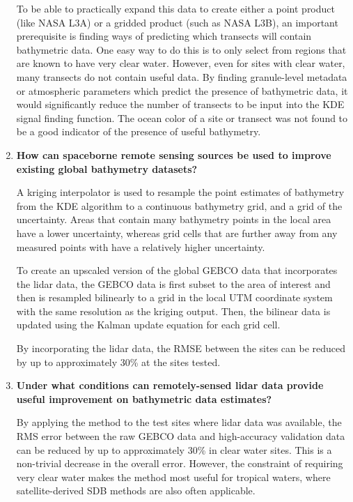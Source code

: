 \begin{enumerate}
    To be able to practically expand this data to create either a point product (like NASA L3A) or a gridded product (such as NASA L3B), an important prerequisite is finding ways of predicting which transects will contain bathymetric data. One easy way to do this is to only select from regions that are known to have very clear water. However, even for sites with clear water, many transects do not contain useful data. By finding granule-level metadata or atmospheric parameters which predict the presence of bathymetric data, it would significantly reduce the number of transects to be input into the KDE signal finding function. The ocean color of a site or transect was not found to be a good indicator of the presence of useful bathymetry.

    \item \textbf{How can spaceborne remote sensing sources be used to improve existing global bathymetry datasets?}
    
    A kriging interpolator is used to resample the point estimates of bathymetry from the KDE algorithm to a continuous bathymetry grid, and a grid of the uncertainty. Areas that contain many bathymetry points in the local area have a lower uncertainty, whereas grid cells that are further away from any measured points with have a relatively higher uncertainty.

    To create an upscaled version of the global GEBCO data that incorporates the lidar data, the GEBCO data is first subset to the area of interest and then is resampled bilinearly to a grid in the local UTM coordinate system with the same resolution as the kriging output. Then, the bilinear data is updated using the Kalman update equation for each grid cell. 

    By incorporating the lidar data, the RMSE between the sites can be reduced by up to approximately 30\% at the sites tested.
    
    \item \textbf{Under what conditions can remotely-sensed lidar data provide useful improvement on bathymetric data estimates?}
    
    By applying the method to the test sites where lidar data was available, the RMS error between the raw GEBCO data and high-accuracy validation data can be reduced by up to approximately 30\% in clear water sites. This is a non-trivial decrease in the overall error. However, the constraint of requiring very clear water makes the method most useful for tropical waters, where satellite-derived SDB methods are also often applicable. 


\end{enumerate}

